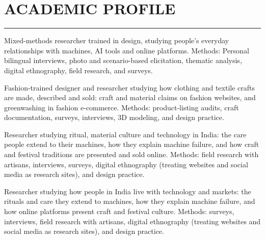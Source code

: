 \documentclass[10pt,letterpaper]{article}
\newcommand{\sectionrule}{\par\vspace{-2pt}\noindent\rule{\linewidth}{0.4pt}\par\vspace{2pt}}
\newcommand{\body}[1]{{\setlength{\rightskip}{2.7em}#1\par}}
\newenvironment{spread}[2][\normalsize]{\par\begingroup\linespread{#2}#1\selectfont}{\par\endgroup}
\begin{document}
\begin{spread}{1.07}
\section{\MakeUppercase{Academic Profile}}
\sectionrule
\ifdefined\EDRES
\body{Mixed-methods researcher trained in design, studying people's everyday relationships with machines, AI tools and online platforms. Methods: Personal bilingual interviews, photo and scenario-based elicitation, thematic analysis, digital ethnography, field research, and surveys.}
\else\ifdefined\TEXTILE
\body{Fashion-trained designer and researcher studying how clothing and textile crafts are made, described and sold: craft and material claims on fashion websites, and greenwashing in fashion e-commerce. Methods: product-listing audits, craft documentation, surveys, interviews, 3D modeling, and design practice.}
\else\ifdefined\ANTHRO
\body{Researcher studying ritual, material culture and technology in India: the care people extend to their machines, how they explain machine failure, and how craft and festival traditions are presented and sold online. Methods: field research with artisans, interviews, surveys, digital ethnography (treating websites and social media as research sites), and design practice.}
\else\ifdefined\SOCSCI
\body{Researcher studying how people in India live with technology and markets: the rituals and care they extend to machines, how they explain machine failure, and how online platforms present craft and festival culture. Methods: surveys, interviews, field research with artisans, digital ethnography (treating websites and social media as research sites), and design practice.}
\else\ifdefined\RELIG

\end{spread}
\end{document}
